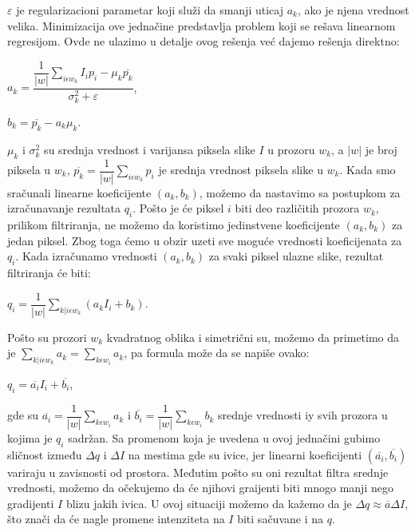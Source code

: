 \documentclass[a4paper,12pt,titlepage]{article}
\begin{document}
$\varepsilon$ je regularizacioni parametar koji služi da smanji uticaj $a_k$, ako je njena vrednost velika. Minimizacija ove jednačine predstavlja problem koji se rešava linearnom regresijom. Ovde ne ulazimo u detalje ovog rešenja već dajemo rešenja direktno:

\begin{center}
	$a_k = \dfrac{\dfrac{1}{|w|} \sum_{i \epsilon w_k} I_ip_i - \mu_k \overline{p_k}}{\sigma_k^2 + \varepsilon}$,
\end{center}

\begin{center}
	$b_k = \overline{p_k} - a_k \mu_k$.
\end{center}

$\mu_k$ i $\sigma_k^2$ su srednja vrednost i varijansa piksela slike $I$ u prozoru $w_k$, a $|w|$ je broj piksela u $w_k$, $\overline{p_k} = \dfrac{1}{|w|} \sum_{i \epsilon w_k} p_i$ je srednja vrednost piksela slike u $w_k$. Kada smo sračunali linearne koeficijente $(a_k, b_k)$, možemo da nastavimo sa postupkom za izračunavanje rezultata $q_i$. Pošto je će piksel $i$ biti deo različitih prozora $w_k$, prilikom filtriranja, ne možemo da koristimo jedinstvene koeficijente $(a_k, b_k)$ za jedan piksel. Zbog toga ćemo u obzir uzeti sve moguće vrednosti koeficijenata za $q_i$. Kada izračunamo vrednosti $(a_k, b_k)$ za svaki piksel ulazne slike, rezultat filtriranja će biti:

\begin{center}
	$q_i = \dfrac{1}{|w|} \sum_{k|i \epsilon w_k} (a_kI_i + b_k)$.
\end{center}    

Pošto su prozori $w_k$ kvadratnog oblika i simetrični su, možemo da primetimo da je $\sum_{k|i \epsilon w_k} a_k = \sum_{k \epsilon w_i} a_k$, pa formula može da se napiše ovako:

\begin{center}
	$q_i = \overline{a_i}I_i + \overline{b_i}$,
\end{center}

gde su $\overline{a_i} = \dfrac{1}{|w|}\sum_{k \epsilon w_i} a_k$ i $\overline{b_i} = \dfrac{1}{|w|}\sum_{k \epsilon w_i} b_k$ srednje vrednosti iy svih prozora u kojima je $q_i$ sadržan. Sa promenom koja je uvedena u ovoj jednačini gubimo sličnost između $\Delta q$ i $\Delta I$ na mestima gde su ivice, jer linearni koeficijenti $(\overline{a_i}, \overline{b_i})$ variraju u zavisnosti od prostora. Međutim pošto su oni rezultat filtra srednje vrednosti, možemo da očekujemo da će njihovi graijenti biti mnogo manji nego gradijenti $I$ blizu jakih ivica. U ovoj situaciji možemo da kažemo da je $\Delta q \approx \overline{a} \Delta I$, što znači da će nagle promene intenziteta na $I$ biti sačuvane i na $q$. 
\end{document}
